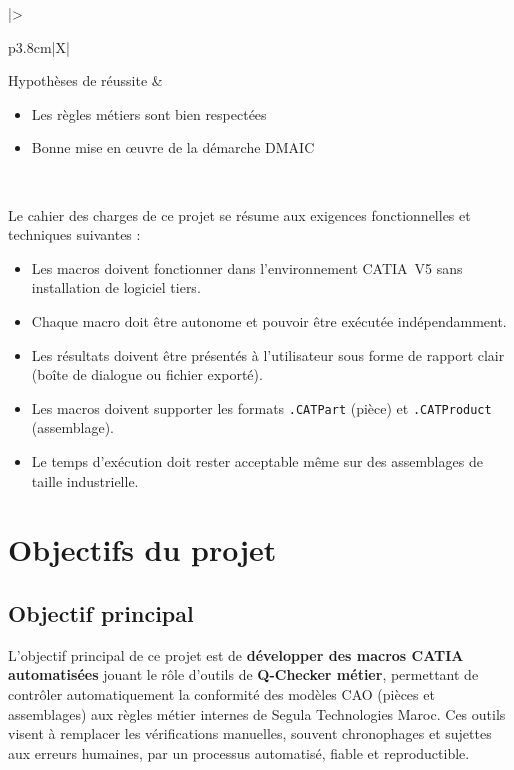 \begin{table}[H]
\begin{tabularx}{\textwidth}{|>{\bfseries\raggedright\arraybackslash}p{3.8cm}|X|}
Hypothèses de réussite &
  \begin{minipage}[t]{\linewidth}
    \begin{itemize}[leftmargin=*, nosep, topsep=0pt, partopsep=0pt, label=\textbullet]
      \item Les règles métiers sont bien respectées
      \item Bonne mise en œuvre de la démarche DMAIC
    \end{itemize}
    \vspace{4pt}
  \end{minipage} \\
\hline

\end{tabularx}
\end{table}

Le cahier des charges de ce projet se résume aux exigences fonctionnelles et techniques suivantes :

\begin{itemize}
    \item[•] Les macros doivent fonctionner dans l'environnement CATIA~V5 sans installation de logiciel tiers.
    \item[•] Chaque macro doit être autonome et pouvoir être exécutée indépendamment.
    \item[•] Les résultats doivent être présentés à l'utilisateur sous forme de rapport clair (boîte de dialogue ou fichier exporté).
    \item[•] Les macros doivent supporter les formats \texttt{.CATPart} (pièce) et \texttt{.CATProduct} (assemblage).
    \item[•] Le temps d'exécution doit rester acceptable même sur des assemblages de taille industrielle.
\end{itemize}

\section{Objectifs du projet}

\subsection{Objectif principal}

L'objectif principal de ce projet est de \textbf{développer des macros CATIA automatisées} jouant le rôle d'outils de \textbf{Q-Checker métier}, permettant de contrôler automatiquement la conformité des modèles CAO (pièces et assemblages) aux règles métier internes de Segula Technologies Maroc. Ces outils visent à remplacer les vérifications manuelles, souvent chronophages et sujettes aux erreurs humaines, par un processus automatisé, fiable et reproductible.

